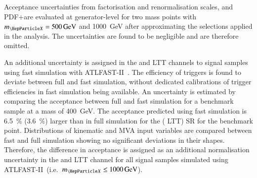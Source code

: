 Acceptance uncertainties from factorisation and renormalisation scales, and
PDF+\alphas are evaluated at generator-level for two mass points with
$\mX = \SI{500}{\GeV}$ and \SI{1000}{\GeV} after approximating the selections
applied in the analysis. The uncertainties are found to be negligible and are
therefore omitted.

An additional uncertainty is assigned in the \hadhad and \lephad LTT channels to
signal samples using fast simulation with
\textsc{ATLFAST-II}~\cite{SOFT-2010-01}. The efficiency of \tauhadvis triggers
is found to deviate between full and fast simulation, without dedicated
calibrations of \tauhadvis trigger efficiencies in fast simulation being
available. An uncertainty is estimated by comparing the acceptance between full
and fast simulation for a benchmark sample at a mass of \SI{400}{\GeV}. The
acceptance predicted using fast simulation is \SI{6.5}{\percent}
(\SI{3.6}{\percent}) larger than in full simulation for the \hadhad (\lephad
LTT) SR for the benchmark point. Distributions of kinematic and MVA input
variables are compared between fast and full simulation showing no significant
deviations in their shapes. Therefore, the difference in acceptance is assigned
as an additional normalisation uncertainty in the \hadhad and \lephad LTT
channel for all signal samples simulated using \textsc{ATLFAST-II}~(i.e.\
$\mX \leq \SI{1000}{\GeV}$).

